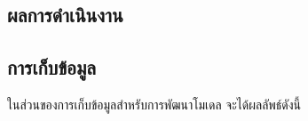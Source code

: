 \documentclass[12pt,oneside,openright,a4paper]{cpe-thai-project}
\begin{document}
\begin{itemize}

\chapter{ผลการดำเนินงาน}

  \section{การเก็บข้อมูล}
    \hspace{1cm}ในส่วนของการเก็บข้อมูลสำหรับการพัฒนาโมเดล จะได้ผลลัพธ์ดังนี้


\end{itemize}
\end{document}
